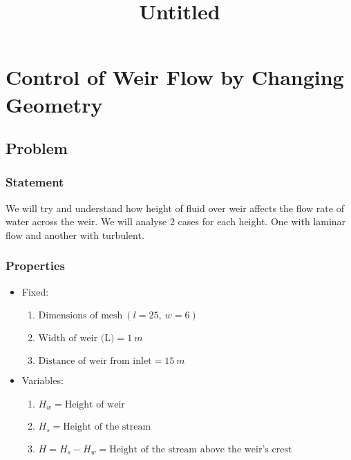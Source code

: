 \documentclass[11pt]{article}
\title{Untitled}
\providecommand{\tightlist}{%
      \setlength{\itemsep}{0pt}\setlength{\parskip}{0pt}}
\begin{document}
    
    \maketitle
    
    

    
    \hypertarget{control-of-weir-flow-by-changing-geometry}{%
\section{Control of Weir Flow by Changing
Geometry}\label{control-of-weir-flow-by-changing-geometry}}

\hypertarget{problem}{%
\subsection{Problem}\label{problem}}

\hypertarget{statement}{%
\subsubsection{Statement}\label{statement}}

We will try and understand how height of fluid over weir affects the
flow rate of water across the weir. We will analyse 2 cases for each
height. One with laminar flow and another with turbulent.

\hypertarget{properties}{%
\subsubsection{Properties}\label{properties}}

\begin{itemize}
\tightlist
\item
  Fixed:

  \begin{enumerate}
  \def\labelenumi{\arabic{enumi}.}
  \tightlist
  \item
    \(\text{Dimensions of mesh}\ (l = 25,\ w = 6)\)
  \item
    \(\text{Width of weir (L)} = 1\ m\)
  \item
    \(\text{Distance of weir from inlet} = 15\ m\)
  \end{enumerate}
\item
  Variables:

  \begin{enumerate}
  \def\labelenumi{\arabic{enumi}.}
  \tightlist
  \item
    \(H_w = \text{Height of weir}\)
  \item
    \(H_s = \text{Height of the stream}\)
  \item
    \(H = H_s - H_w = \text{Height of the stream above the weir's crest}\)
  \end{enumerate}
\end{itemize}
\end{document}
